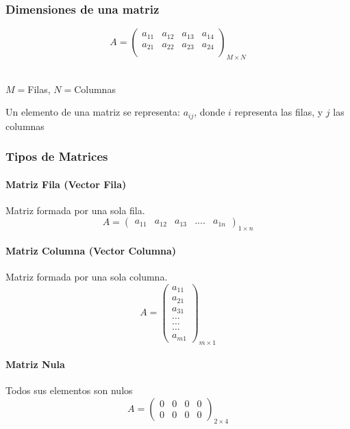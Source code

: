 \documentclass[stu, 12pt, letterpaper, donotrepeattitle, floatsintext, natbib]{apa7}
\begin{document}
    \subsubsection{Dimensiones de una matriz}
    \[
        A=\begin{pmatrix}
              a_{11} & a_{12} & a_{13} & a_{14} \\
              a_{21} & a_{22} & a_{23} & a_{24} \\
        \end{pmatrix}_{M\times N}
    \]\\
    \begin{small}
        \begin{center}
            $M= $Filas, $N= $Columnas
        \end{center}
    \end{small}

    Un elemento de una matriz se representa: {\Large $a_{ij}$}, donde {\Large $i$} representa las filas, y {\Large $j$} las columnas\\

    \subsubsection{Tipos de Matrices}

    \paragraph{Matriz Fila (Vector Fila)}
    Matriz formada por una sola fila.
    \[A=\begin{pmatrix}
            a_{11} & a_{12} & a_{13} & .... & a_{1n}
    \end{pmatrix}_{1\times n}\]

    \paragraph{Matriz Columna (Vector Columna)}
    Matriz formada por una sola columna.
    \[A=\begin{pmatrix}
            a_{11} \\ a_{21} \\ a_{31} \\ \dots \\ \dots \\ \dots \\ a_{m1}
    \end{pmatrix}_{m\times1}\]

    \paragraph{Matriz Nula}
    Todos sus elementos son nulos
    \[A=\begin{pmatrix}
            0 & 0 & 0 & 0 \\ 0 & 0 & 0 & 0
    \end{pmatrix}_{2\times4}\]
\end{document}

